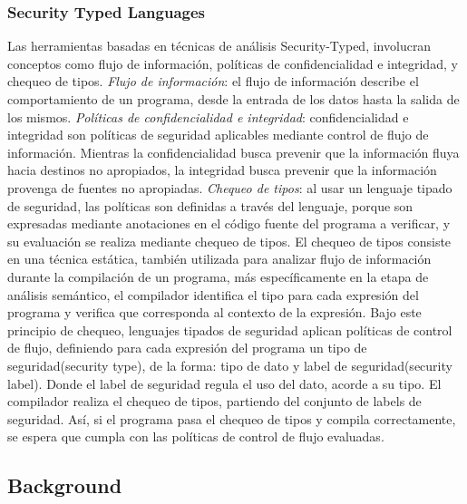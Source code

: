 \subsubsection{Security Typed Languages}
Las herramientas basadas en técnicas de análisis Security-Typed, involucran
conceptos como flujo de información, políticas de confidencialidad e integridad,
y chequeo de tipos.
\emph{Flujo de información}: el flujo de información describe el
comportamiento de un programa, desde la entrada de los datos hasta la salida de
los mismos.\newline 
\emph{Políticas de confidencialidad e integridad}: confidencialidad e integridad
son políticas de seguridad aplicables mediante control de flujo de información.
Mientras la confidencialidad busca prevenir que la información fluya hacia
destinos no apropiados, la integridad busca prevenir que la información provenga
de fuentes no apropiadas\cite{LanguageIFS-2013}.\newline
\emph{Chequeo de tipos}: al usar un lenguaje tipado de seguridad, las políticas
son definidas a través del lenguaje, porque son expresadas mediante anotaciones
en el código fuente del programa a verificar, y su evaluación se realiza
mediante chequeo de tipos.\newline 
El chequeo de tipos consiste en una técnica estática,
también utilizada para analizar flujo de información durante la compilación de
un programa, más específicamente en la etapa de análisis semántico, el
compilador identifica el tipo para cada expresión del programa y verifica que
corresponda al contexto de la expresión.
Bajo este principio de chequeo, lenguajes tipados de seguridad aplican
políticas de control de flujo, definiendo para cada expresión del programa un
tipo de seguridad(security type), de la forma:  tipo de dato y label de
seguridad(security label). Donde el label de seguridad regula el uso del dato,
acorde a su tipo.\newline 
El compilador realiza el chequeo de tipos, partiendo del conjunto de labels de
seguridad. Así, si el programa pasa el chequeo de tipos y compila correctamente,
se espera que cumpla con las políticas de control de flujo evaluadas.

\subsection{Background}
